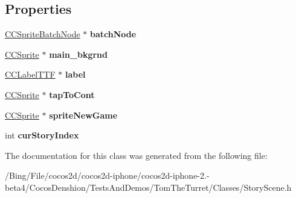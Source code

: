 \subsection*{Properties}
\begin{DoxyCompactItemize}
\item 
\hypertarget{interface_story_layer_a73de6cbad4dc72e477fcbad8a0d86b73}{\hyperlink{interface_c_c_sprite_batch_node}{C\-C\-Sprite\-Batch\-Node} $\ast$ {\bfseries batch\-Node}}\label{interface_story_layer_a73de6cbad4dc72e477fcbad8a0d86b73}

\item 
\hypertarget{interface_story_layer_a6b7d5ad58b5fd546deb679cea533ffba}{\hyperlink{class_c_c_sprite}{C\-C\-Sprite} $\ast$ {\bfseries main\-\_\-bkgrnd}}\label{interface_story_layer_a6b7d5ad58b5fd546deb679cea533ffba}

\item 
\hypertarget{interface_story_layer_ab7aeab0f80fb27969a08ad4a35216348}{\hyperlink{class_c_c_label_t_t_f}{C\-C\-Label\-T\-T\-F} $\ast$ {\bfseries label}}\label{interface_story_layer_ab7aeab0f80fb27969a08ad4a35216348}

\item 
\hypertarget{interface_story_layer_ad7cebe962d1c51d063c45158ac2a0336}{\hyperlink{class_c_c_sprite}{C\-C\-Sprite} $\ast$ {\bfseries tap\-To\-Cont}}\label{interface_story_layer_ad7cebe962d1c51d063c45158ac2a0336}

\item 
\hypertarget{interface_story_layer_af6d0e7676cdf9fde5c6ea5457a1140e5}{\hyperlink{class_c_c_sprite}{C\-C\-Sprite} $\ast$ {\bfseries sprite\-New\-Game}}\label{interface_story_layer_af6d0e7676cdf9fde5c6ea5457a1140e5}

\item 
\hypertarget{interface_story_layer_acee6357606ca567dc9c1be7ad31fd9fc}{int {\bfseries cur\-Story\-Index}}\label{interface_story_layer_acee6357606ca567dc9c1be7ad31fd9fc}

\end{DoxyCompactItemize}


The documentation for this class was generated from the following file\-:\begin{DoxyCompactItemize}
\item 
/\-Bing/\-File/cocos2d/cocos2d-\/iphone/cocos2d-\/iphone-\/2.-\/beta4/\-Cocos\-Denshion/\-Tests\-And\-Demos/\-Tom\-The\-Turret/\-Classes/Story\-Scene.\-h\end{DoxyCompactItemize}
